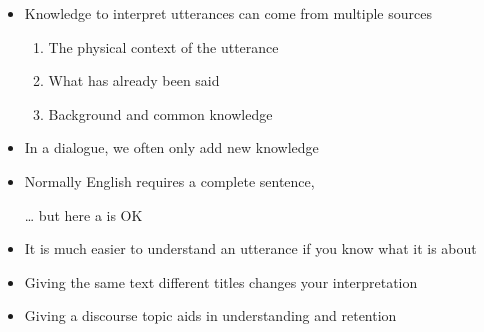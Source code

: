 \documentclass[headrule,footrule]{foils}
\begin{document}
\begin{itemize}
\item Knowledge to interpret utterances can come from multiple sources
  \begin{enumerate}
  \item The physical context of the utterance
    \\ 
  \item What has already been said
    \\ 
  \item Background and common knowledge
    \\ 
  \end{enumerate}
\end{itemize}

\begin{itemize}
\item In a dialogue, we often only add new knowledge
  \begin{exe}
    \ex 
    \begin{xlist}
      \ex {}
      \ex {}
  \end{xlist}
    \ex 
    \begin{xlist}
      \ex {}
      \ex {}
  \end{xlist}
  \end{exe}
\item Normally English requires a complete sentence, 
\item[\ldots] but here a  is OK
\end{itemize}

\begin{itemize}
\item It is much easier to understand an utterance if you know what
  it is about \citep{Bransford:Johnson:1972}

\item Giving the same text different titles changes your interpretation

\item Giving a discourse topic aids in understanding and retention

\end{itemize}

\end{document}
